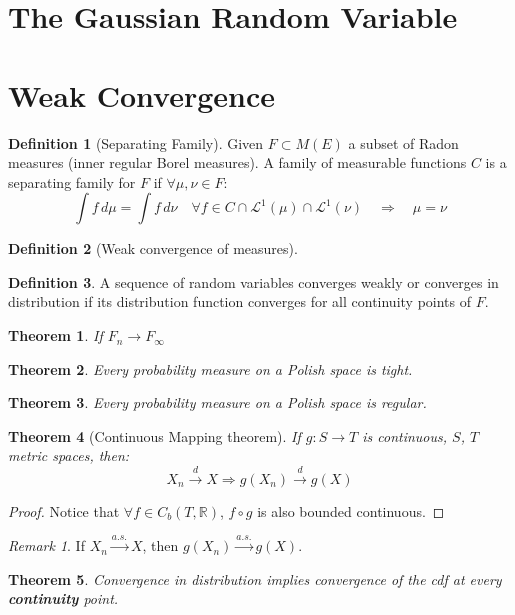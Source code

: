 \documentclass[a4paper,11pt]{book}
\newtheorem{theorem}{Theorem}[section]
\theoremstyle{definition}
\newtheorem{definition}{Definition}[section]
\theoremstyle{remark}
\newtheorem*{remark}{Remark}
\begin{document}
\section{The Gaussian Random Variable}



\section{Weak Convergence}
\begin{definition}[Separating Family]
	Given $F \subset M(E)$ a subset of Radon measures (inner regular Borel measures). A family of measurable functions $C$ is a separating family for $F$ if $\forall \mu, \nu \in F$:
	\begin{equation*}
		\int f \, d\mu = \int f \, d\nu \quad \forall f \in C \cap \mathcal{L}^1(\mu) \cap \mathcal{L}^1(\nu) \quad \Rightarrow \quad \mu = \nu
	\end{equation*}
\end{definition}

\begin{definition}[Weak convergence of measures]

\end{definition}


\begin{definition}
	A sequence of random variables converges weakly or converges in distribution if its distribution function converges for all continuity points of $F$.
\end{definition}

\begin{theorem}
	If $F_n \rightarrow F_\infty$
\end{theorem}

\begin{theorem}
	Every probability measure on a Polish space is tight.
\end{theorem}

\begin{theorem}
	Every probability measure on a Polish space is regular.
\end{theorem}

\begin{theorem}[Continuous Mapping theorem]
	If $g: S \rightarrow T$ is continuous, $S$, $T$ metric spaces, then:
	\begin{equation*}
		X_n \overset{d}{\rightarrow} X \Rightarrow g(X_n) \overset{d}{\rightarrow} g(X)
	\end{equation*}
\end{theorem}
\begin{proof}
	Notice that $\forall f \in C_b(T, \mathbb{R})$, $f\circ g$ is also bounded continuous.
\end{proof}
\begin{remark}
If $X_n \overset{a.s.}{\longrightarrow} X$, then $g(X_n) \overset{a.s.}{\longrightarrow} g(X)$.
\end{remark}

\begin{theorem}
	Convergence in distribution implies convergence of the cdf at every \textbf{continuity} point.
\end{theorem}
\end{document}
